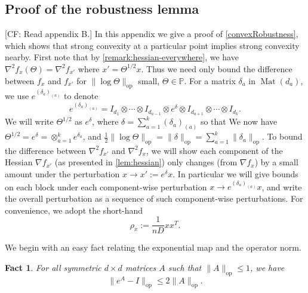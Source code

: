 \documentclass[aos]{imsart}
\newtheorem{fact}[theorem]{Fact}
\theoremstyle{definition}
\numberwithin{equation}{section}
\DeclareMathOperator{\op}{op}
\DeclareMathOperator{\Mat}{Mat}
\renewcommand{\P}{{\mathbb{P}}}
\newcommand{\samp}{x}
\newcommand{\CF}[1]{{\color{purple}[CF: #1]}}
\newcommand{\MW}[1]{{\color{red}[MW: #1]}}
\newcommand{\CF}[1]{{}}
\newcommand{\MW}[1]{{}}
\begin{document}
\begin{appendix}
\section{Proof of the robustness lemma}\label{app:robust}
\CF{Read appendix B.}
In this appendix we give a proof of \cref{convexRobustness}, which shows that strong convexity at a particular point implies strong convexity nearby.
First note that by \cref{remark:hessian-everywhere}, we have $\nabla^2 f_\samp(\Theta) = \nabla^2 f_{\samp'}$ where $\samp' = \Theta^{1/2} \samp$.
Thus we need only bound the difference between $f_\samp$ and $f_{\samp'}$ for $\|\log \Theta\|_{\op}$ small, $\Theta \in \P$.
For a matrix $\delta_{a}$ in $\Mat(d_a)$, we use
$e^{(\delta_{a})_{(a)}}$ to denote 
$$ e^{(\delta_{a})_{(a)}} = I_{d_1} \otimes \cdots \otimes I_{d_{a-1}} \otimes e^{\delta} \otimes I_{d_{a+1}} \otimes \cdots \otimes I_{d_k}.$$
We will write $\Theta^{1/2}$ as $e^{\delta}$, where $\delta = \sum_{a=1}^k (\delta_{a})_{(a)}$ so that 
We now have 
$\Theta^{1/2} = e^{\delta} = \otimes_{a = 1}^k e^{\delta_a}$, and $\frac{1}{2}\|\log \Theta\|_{\op} = \|\delta\|_{\op} = \sum_{a =1}^k \|\delta_{a}\|_{\op}$.
To bound the difference between $\nabla^2 f_{x'}$ and $\nabla^2 f_x$, we will show each component of the Hessian $\nabla f_{x'}$ (as presented in \cref{lem:hessian}) only changes (from $\nabla f_x$) by a small amount under the perturbation $x \to x' := e^\delta x$.
In particular we will give bounds on each block under each component-wise perturbation $x \to e^{(\delta_{a})_{(a)}} x$, and write the overall perturbation as a sequence of such component-wise perturbations. For convenience, we adopt the short-hand
$$ \rho_x:= \frac{1}{nD} x x^T.$$



We begin with an easy fact relating the exponential map and the operator norm.

\begin{fact} \label{f:expTaylor} For all symmetric $d\times d$ matrices $A$ such that $ \|A\|_{\op} \leq 1$, we have
$$ \|e^{A} - I\|_{\op} \leq 2 \|A\|_{\op}.$$
\end{fact}



\end{appendix}
\end{document}
